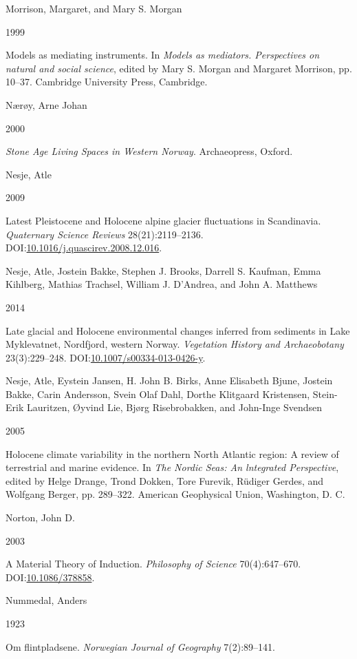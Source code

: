 \documentclass[
  a4paper,
  oneside]{uiophdthesis}
\newlength{\cslhangindent}
\newlength{\csllabelwidth}
\newlength{\cslentryspacingunit} %
\newenvironment{CSLReferences}[2] %
 {%
  \setlength{\parindent}{0pt}
  \ifodd #1
  \let\oldpar\par
  \def\par{\hangindent=\cslhangindent\oldpar}
  \fi
  \setlength{\parskip}{#2\cslentryspacingunit}
 }%
 {}
\newcommand{\CSLBlock}[1]{#1\hfill\break}
\newcommand{\CSLLeftMargin}[1]{\parbox[t]{\csllabelwidth}{#1}}
\newcommand{\CSLRightInline}[1]{\parbox[t]{\linewidth - \csllabelwidth}{#1}\break}
\begin{document}
\begin{CSLReferences}{0}{0}
\leavevmode{}%
\CSLBlock{Morrison, Margaret, and Mary S. Morgan}
\CSLLeftMargin{ 1999}
\CSLRightInline{Models as mediating instruments. In \emph{Models as mediators. Perspectives on natural and social science}, edited by Mary S. Morgan and Margaret Morrison, pp. 10--37. Cambridge University Press, Cambridge.}

\leavevmode{}%
\CSLBlock{Nærøy, Arne Johan}
\CSLLeftMargin{ 2000}
\CSLRightInline{\emph{{Stone Age Living Spaces in Western Norway}}. Archaeopress, Oxford.}

\leavevmode{}%
\CSLBlock{Nesje, Atle}
\CSLLeftMargin{ 2009}
\CSLRightInline{Latest Pleistocene and Holocene alpine glacier fluctuations in Scandinavia. \emph{Quaternary Science Reviews} 28(21):2119--2136. DOI:\href{https://doi.org/10.1016/j.quascirev.2008.12.016}{10.1016/j.quascirev.2008.12.016}.}

\leavevmode{}%
\CSLBlock{Nesje, Atle, Jostein Bakke, Stephen J. Brooks, Darrell S. Kaufman, Emma Kihlberg, Mathias Trachsel, William J. D'Andrea, and John A. Matthews}
\CSLLeftMargin{ 2014}
\CSLRightInline{Late glacial and Holocene environmental changes inferred from sediments in Lake Myklevatnet, Nordfjord, western Norway. \emph{Vegetation History and Archaeobotany} 23(3):229--248. DOI:\href{https://doi.org/10.1007/s00334-013-0426-y}{10.1007/s00334-013-0426-y}.}

\leavevmode{}%
\CSLBlock{Nesje, Atle, Eystein Jansen, H. John B. Birks, Anne Elisabeth Bjune, Jostein Bakke, Carin Andersson, Svein Olaf Dahl, Dorthe Klitgaard Kristensen, Stein-Erik Lauritzen, Øyvind Lie, Bjørg Risebrobakken, and John-Inge Svendsen}
\CSLLeftMargin{ 2005}
\CSLRightInline{{Holocene climate variability in the northern North Atlantic region: A review of terrestrial and marine evidence}. In \emph{{The Nordic Seas: An lntegrated Perspective}}, edited by Helge Drange, Trond Dokken, Tore Furevik, Rüdiger Gerdes, and Wolfgang Berger, pp. 289--322. American Geophysical Union, Washington, D. C.}

\leavevmode{}%
\CSLBlock{Norton, John D.}
\CSLLeftMargin{ 2003}
\CSLRightInline{{A Material Theory of Induction}. \emph{Philosophy of Science} 70(4):647--670. DOI:\href{https://doi.org/10.1086/378858}{10.1086/378858}.}

\leavevmode{}%
\CSLBlock{Nummedal, Anders}
\CSLLeftMargin{ 1923}
\CSLRightInline{Om flintpladsene. \emph{Norwegian Journal of Geography} 7(2):89--141.}


\end{CSLReferences}
\end{document}
